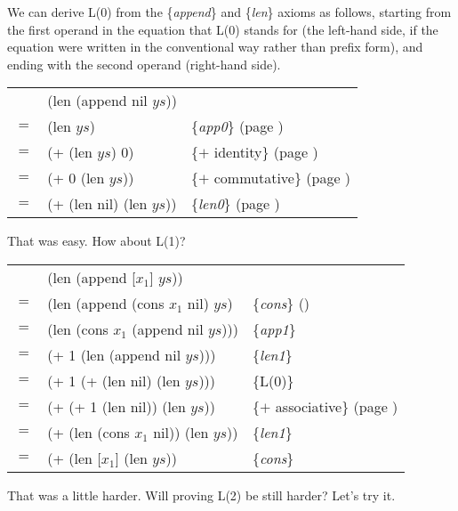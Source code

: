 We can derive L(0) from the \{\emph{append}\} and \{\emph{len}\} axioms as follows,
starting from the first operand in the equation that L(0) stands for
(the left-hand side, if the equation were written in the conventional way rather than prefix form),
and ending with the second operand (right-hand side).

\begin{center}
\begin{tabular}{lll}
    & (len (append nil $ys$))  &                                                \\
$=$ & (len $ys$)               & \{\emph{app0}\}     (page \pageref{append-equations})\\
$=$ & (+ (len $ys$) 0)         & \{$+$ identity\}    (page \pageref{fig-02-01}) \\
$=$ & (+ 0 (len $ys$))         & \{$+$ commutative\} (page \pageref{fig-02-01}) \\
$=$ & (+ (len nil) (len $ys$)) & \{\emph{len0}\}     (page \pageref{len-equations})
\end{tabular}
\end{center}

That was easy. How about L(1)?

\begin{center}
\begin{tabular}{lll}
    & (len (append [$x_1$] $ys$))           &                     \\
$=$ & (len (append (cons $x_1$ nil) $ys$)   & \{\emph{cons}\} (\pageref{first-rest-cons}) \\
$=$ & (len (cons $x_1$ (append nil $ys$)))  & \{\emph{app1}\}     \\
$=$ & (+ 1 (len (append nil $ys$)))         & \{\emph{len1}\}     \\
$=$ & (+ 1 (+ (len nil) (len $ys$)))        & \{L(0)\}            \\
$=$ & (+ (+ 1 (len nil)) (len $ys$))        & \{$+$ associative\} (page \pageref{fig-02-01}) \\
$=$ & (+ (len (cons $x_1$ nil)) (len $ys$)) & \{\emph{len1}\}     \\
$=$ & (+ (len [$x_1$] (len $ys$))           & \{\emph{cons}\}     \\
\end{tabular}
\end{center}

That was a little harder. Will proving L(2) be still harder? Let's try it.


